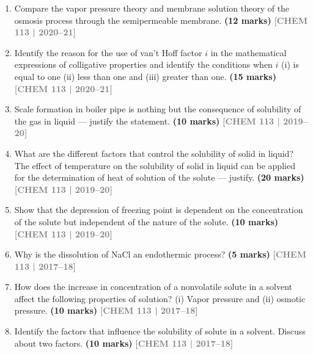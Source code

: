 \documentclass[12pt,a3paper]{article}
\newcommand{\yr}[1]{\hfill\textcolor{gray}{\small\textbf{[#1]}}}
\newcommand{\mk}[1]{\textcolor{orange!70!black}{\small\textbf{(#1 marks)}}}
\begin{document}
\begin{enumerate}
\item Compare the vapor pressure theory and membrane solution theory of the osmosis process through the semipermeable membrane. \mk{12}
\yr{CHEM 113 | 2020--21}



\item Identify the reason for the use of van't Hoff factor $i$ in the mathematical expressions of colligative properties and identify the conditions when $i$ (i) is equal to one (ii) less than one and (iii) greater than one. \mk{15}
\yr{CHEM 113 | 2020--21}



\item Scale formation in boiler pipe is nothing but the consequence of solubility of the gas in liquid --- justify the statement. \mk{10}
\yr{CHEM 113 | 2019--20}




\item What are the different factors that control the solubility of solid in liquid? The effect of temperature on the solubility of solid in liquid can be applied for the determination of heat of solution of the solute --- justify. \mk{20}
\yr{CHEM 113 | 2019--20}




\item Show that the depression of freezing point is dependent on the concentration of the solute but independent of the nature of the solute. \mk{10}
\yr{CHEM 113 | 2019--20}




\item Why is the dissolution of NaCl an endothermic process? \mk{5}
\yr{CHEM 113 | 2017--18}



\item How does the increase in concentration of a nonvolatile solute in a solvent affect the following properties of solution? (i) Vapor pressure and (ii) osmotic pressure. \mk{10}
\yr{CHEM 113 | 2017--18}



\item Identify the factors that influence the solubility of solute in a solvent. Discuss about two factors. \mk{10}
\yr{CHEM 113 | 2017--18}




\end{enumerate}
\end{document}
